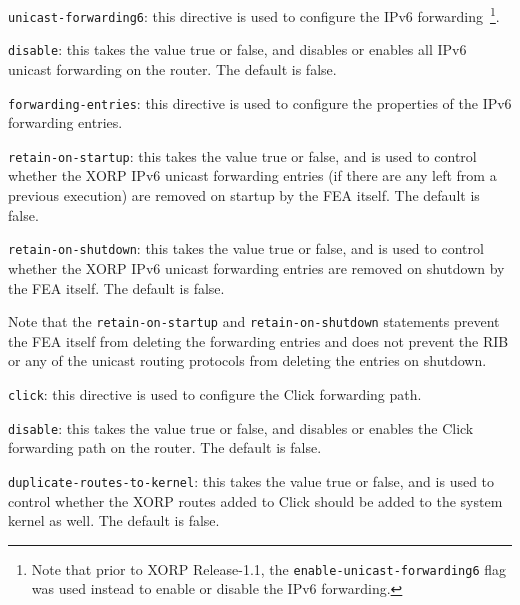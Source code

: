 \begin{description}
\item{\tt unicast-forwarding6}: this directive is used to configure the IPv6
  forwarding~\footnote{Note that prior to XORP Release-1.1, the
  {\tt enable-unicast-forwarding6} flag was used instead to enable or disable
  the IPv6 forwarding.}.
\begin{description}
\item{\tt disable}: this takes the value {\stt true} or {\stt false},
  and disables or enables all IPv6 unicast forwarding on the router.
  The default is {\stt false}.
\item{\tt forwarding-entries}: this directive is used to configure the
  properties of the IPv6 forwarding entries.
\begin{description}
\item{\tt retain-on-startup}: this takes the value {\stt true} or
  {\stt false}, and is used to control whether the XORP IPv6 unicast
  forwarding entries (if there are any left from a previous execution)
  are removed on startup by the FEA itself. The default is {\stt false}.
\item{\tt retain-on-shutdown}: this takes the value {\stt true} or
  {\stt false}, and is used to control whether the XORP IPv6 unicast
  forwarding entries are removed on shutdown by the FEA itself.
  The default is {\stt false}.
\end{description}
   Note that the {\tt retain-on-startup} and {\tt retain-on-shutdown}
   statements prevent the FEA itself from deleting the forwarding
   entries and does not prevent the RIB or any of the unicast routing
   protocols from deleting the entries on shutdown.
\end{description}

\item{\tt click}: this directive is used to configure the Click
  forwarding path.
\begin{description}
\item{\tt disable}: this takes the value {\stt true} or {\stt false},
  and disables or enables the Click forwarding path on the router. The
  default is {\stt false}.
\item{\tt duplicate-routes-to-kernel}: this takes the value {\stt true}
  or {\stt false}, and is used to control whether the XORP routes added
  to Click should be added to the system kernel as well. The default is
  {\stt false}.


\end{description}
\end{description}
